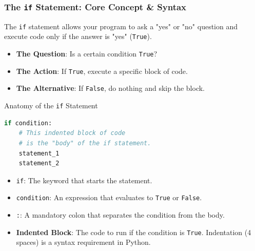 \documentclass{beamer}
\begin{document}
\begin{frame}[fragile]
    \frametitle{The \texttt{if} Statement: Core Concept \& Syntax}
    
    The \texttt{if} statement allows your program to ask a "yes" or "no" question and execute code only if the answer is "yes" (\texttt{True}).
    \begin{itemize}
        \item \textbf{The Question}: Is a certain condition \texttt{True}?
        \item \textbf{The Action}: If \texttt{True}, execute a specific block of code.
        \item \textbf{The Alternative}: If \texttt{False}, do nothing and skip the block.
    \end{itemize}
    
    \begin{block}{Anatomy of the \texttt{if} Statement}
        \begin{lstlisting}[language=Python]
if condition:
    # This indented block of code
    # is the "body" of the if statement.
    statement_1
    statement_2
        \end{lstlisting}
    \end{block}
    \begin{itemize}
        \item \texttt{if}: The keyword that starts the statement.
        \item \texttt{condition}: An expression that evaluates to \texttt{True} or \texttt{False}.
        \item \texttt{:}: A mandatory colon that separates the condition from the body.
        \item \textbf{Indented Block}: The code to run if the condition is \texttt{True}. Indentation (4 spaces) is a syntax requirement in Python.
    \end{itemize}
\end{frame}
\end{document}
